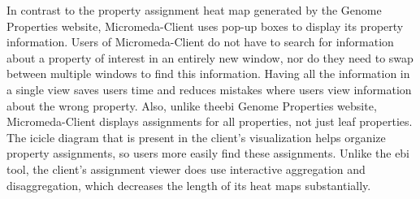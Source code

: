 In contrast to the property assignment heat map generated by the Genome 
Properties website, Micromeda-Client uses pop-up boxes to display its property 
information. Users of Micromeda-Client do not have to search for information 
about a property of interest in an entirely new window, nor do they need to swap 
between multiple windows to find this information. Having all the information in 
a single view saves users time and reduces mistakes where users view information 
about the wrong property. Also, unlike the\gls{ebi} Genome Properties website, 
Micromeda-Client displays assignments for all properties, not just leaf 
properties. The icicle diagram that is present in the client's visualization 
helps organize property assignments, so users more easily find these 
assignments. Unlike the \gls{ebi} tool, the client's assignment viewer does use 
interactive aggregation and disaggregation, which decreases the length of its 
heat maps substantially.

